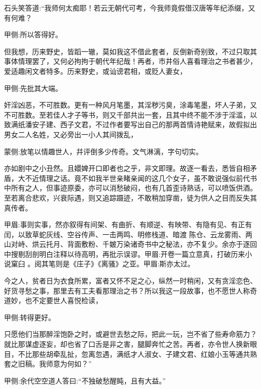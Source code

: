 \begin{parag}
    石头笑答道:“我师何太痴耶！若云无朝代可考，今我师竟假借汉唐等年纪添缀，又有何难？\begin{note}甲侧:所以答得好。\end{note}但我想，历来野史，皆蹈一辙，莫如我这不借此套者，反倒新奇别致，不过只取其事体情理罢了，又何必拘拘于朝代年纪哉！再者，市井俗人喜看理治之书者甚少，爱适趣闲文者特多。历来野史，或讪谤君相，或贬人妻女，\begin{note}甲侧:先批其大端。\end{note}奸淫凶恶，不可胜数。更有一种风月笔墨，其淫秽污臭，涂毒笔墨，坏人子弟，又不可胜数。至若佳人才子等书，则又千部共出一套，且其中终不能不涉于淫滥，以致满纸潘安子建、西子文君，不过作者要写出自己的那两首情诗艳赋来，故假拟出男女二人名姓，又必旁出一小人其间拨乱，\begin{note}蒙侧:放笔以情趣世人，幷评倒多少传奇。文气淋漓，字句切实。\end{note}亦如剧中之小丑然。且嬛婢开口即者也之乎，非文即理。故逐一看去，悉皆自相矛盾，大不近情理之话。竟不如我半世亲睹亲闻的这几个女子，虽不敢说强似前代书中所有之人，但事迹原委，亦可以消愁破闷，也有几首歪诗熟话，可以喷饭供酒。至若离合悲欢，兴衰际遇，则又追踪蹑迹，不敢稍加穿凿，徒为供人之目而反失其真传者。\begin{note}甲眉:事则实事，然亦叙得有间架、有曲折、有顺逆、有映带、有隐有见、有正有闰，以致草蛇灰线、空谷传声、一击两鸣、明修栈道、暗渡 陈仓、云龙雾雨、两山对峙、烘云托月、背面敷粉、千皴万染诸奇书中之秘法，亦不复少。余亦于逐回中搜剔刮剖明白注释以待高明，再批示误谬。甲眉:开卷一篇立意真，打破历来小说窠臼 。阅其笔则是《庄子》《离骚》之亚。甲眉:斯亦太过。\end{note}今之人，贫者日为衣食所累，富者又怀不足之心，纵然一时稍闲，又有贪淫恋色、好货寻愁之事，那里去有工夫看那理治之书？所以我这一段故事，也不愿世人称奇道妙，也不定要世人喜悦检读，\begin{note}甲侧:转得更好。\end{note}只愿他们当那醉淫饱卧之时，或避世去愁之际，把此一玩，岂不省了些寿命筋力？就比那谋虚逐妄，却也省了口舌是非之害，腿脚奔忙之苦。再者，亦令世人换新眼目，不比那些胡牵乱扯，忽离忽遇，满纸才人淑女、子建文君、红娘小玉等通共熟套之旧稿。我师意为何如？”\begin{note}甲侧:余代空空道人答曰:“不独破愁醒盹，且有大益。”\end{note}
\end{parag}


